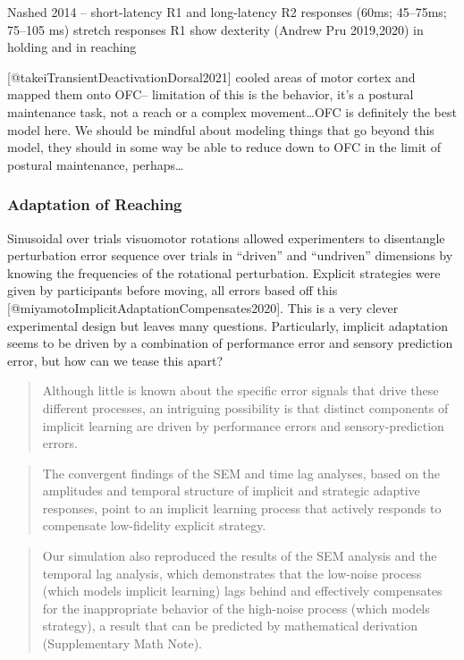 \documentclass[../main.tex]{subfiles}
\begin{document}
Nashed 2014 -- short-latency R1 and long-latency R2 responses (60ms;
45--75ms; 75--105 ms) stretch responses R1 show dexterity (Andrew Pru
2019,2020) in holding and in reaching

{[}@takeiTransientDeactivationDorsal2021{]} cooled areas of motor cortex
and mapped them onto OFC-- limitation of this is the behavior, it's a
postural maintenance task, not a reach or a complex movement\ldots OFC
is definitely the best model here. We should be mindful about modeling
things that go beyond this model, they should in some way be able to
reduce down to OFC in the limit of postural maintenance, perhaps\ldots{}

\subsubsection{Adaptation of Reaching}\label{adaptation-of-reaching}

Sinusoidal over trials visuomotor rotations allowed experimenters to disentangle perturbation error sequence over trials in ``driven'' and ``undriven'' dimensions by knowing the frequencies of the rotational perturbation. Explicit strategies were given by participants before moving, all errors based off this {[}@miyamotoImplicitAdaptationCompensates2020{]}. This is a very clever experimental design but leaves many questions. Particularly, implicit adaptation seems to be driven by a combination of performance error and sensory prediction error, but how can we tease this apart?

\begin{quote}
Although little is known about the specific error signals that drive these different processes, an intriguing possibility is that distinct components of implicit learning are driven by performance errors and sensory-prediction errors.
\end{quote}

\begin{quote}
The convergent findings of the SEM and time lag analyses, based on the amplitudes and temporal structure of implicit and strategic adaptive responses, point to an implicit learning process that actively responds to compensate low-fidelity explicit strategy.
\end{quote}

\begin{quote}
Our simulation also reproduced the results of the SEM analysis and the temporal lag analysis, which demonstrates that the low-noise process (which models implicit learning) lags behind and effectively compensates for the inappropriate behavior of the high-noise process (which models strategy), a result that can be predicted by mathematical derivation (Supplementary Math Note).
\end{quote}
\end{document}
